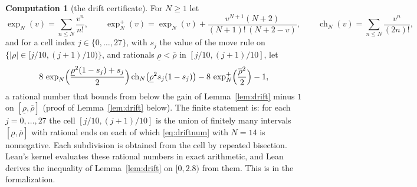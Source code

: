 \documentclass[12pt]{amsart}
\theoremstyle{definition}
\newtheorem{computation}[theorem]{Computation}
\numberwithin{equation}{section}
\newcommand{\ch}{\operatorname{ch}}
\newcommand{\leanmap}[1]{\ignorespaces}
\newcommand{\codemap}[1]{\ignorespaces}
\newcommand{\mapnote}[1]{\ignorespaces}
\begin{document}
\begin{computation}[the drift certificate]\label{comp:drift}
\leanmap{RegretKappa.LowerSharp.drift_table, RegretKappa.LowerSharp.check_sound}
\mapnote{one kernel check for each cell, \lname{RegretKappa.LowerSharp.drift_cell0} to \lname{RegretKappa.LowerSharp.drift_cell27}, on the subdivisions written by \texttt{drift\_cells.gp}}
\codemap{code/drift-cells/drift_cells.gp > code/drift-cells/out/drift_cells.txt}
For $N\ge1$ let
\[
\exp_N(v)=\sum_{n\le N}\frac{v^n}{n!},\qquad\exp_N^+(v)=\exp_N(v)+\frac{v^{N+1}(N+2)}{(N+1)!\,(N+2-v)},\qquad\ch_N(v)=\sum_{n\le N}\frac{v^n}{(2n)!},
\]
and for a cell index $j\in\{0,\dots,27\}$, with $s_j$ the value of the move rule on $\{|\rho|\in[j/10,(j+1)/10)\}$, and rationals $\underline\rho<\overline\rho$ in $[j/10,(j+1)/10]$, let
\begin{equation}\label{eq:driftnum}
8\,\exp_N\Bigl(\frac{\underline\rho^2(1-s_j)+s_j}2\Bigr)\ch_N\bigl(\underline\rho^2s_j(1-s_j)\bigr)-8\,\exp_N^+\Bigl(\frac{\overline\rho^2}2\Bigr)-1,
\end{equation}
a rational number that bounds from below the gain of Lemma~\ref{lem:drift} minus $1$ on $[\underline\rho,\overline\rho]$ (proof of Lemma~\ref{lem:drift} below). The finite statement is: for each $j=0,\dots,27$ the cell $[j/10,(j+1)/10]$ is the union of finitely many intervals $[\underline\rho,\overline\rho]$ with rational ends on each of which \eqref{eq:driftnum} with $N=14$ is nonnegative. Each subdivision is obtained from the cell by repeated bisection. Lean's kernel evaluates these rational numbers in exact arithmetic, and Lean derives the inequality of Lemma~\ref{lem:drift} on $[0,2.8)$ from them. This is  in the formalization.
\end{computation}
\end{document}
